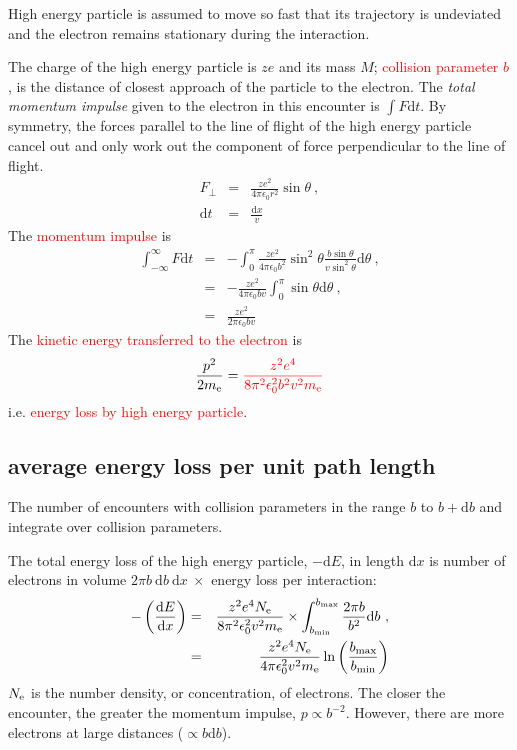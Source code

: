 \documentclass[12pt,a4paper]{article}
\newcommand{\dif}{\mathrm{d}}
\begin{document}
High energy particle is assumed to move so fast that its trajectory is undeviated and the electron remains stationary during the interaction.

The charge of the high energy particle is $ze$ and its mass $M$; \textcolor{red}{collision parameter $b$}, is the distance of closest approach of the particle to the electron. The \emph{total momentum impulse} given to the electron in this encounter is $\int F \dif t$. By symmetry, the forces parallel to the line of flight of the high energy particle cancel out and only work out the component of force perpendicular to the line of flight.
\begin{eqnarray}
\nonumber F_{\perp} &=& \frac{ze^2}{4\pi \epsilon_0 r^2} \sin \theta ~,\\
\nonumber \dif t &=& \frac{\dif x}{v}
\end{eqnarray}
The \textcolor{red}{momentum impulse} is 
\begin{eqnarray*}
\int_{-\infty}^{\infty} F \dif t &=& -\int_{0}^{\pi} \frac{ze^2}{4\pi \epsilon_0 b^2} \sin^2 \theta \frac{b\sin \theta}{v\sin^2 \theta} \dif \theta ~, \\
&=& -\frac{ze^2}{4\pi \epsilon_0 b v} \int_{0}^{\pi} \sin \theta \dif \theta ~, \\
&=& \frac{ze^2}{2\pi \epsilon_0 b v}
\end{eqnarray*}
The \textcolor{red}{kinetic energy transferred to the electron} is
\begin{equation}
\frac{p^2}{2m_{\rm e}} = \textcolor{red}{\frac{z^2 e^4}{8\pi^2 \epsilon^2_0 b^2 v^2 m_{\rm e}} }
\end{equation}
i.e. \textcolor{red}{energy loss by high energy particle}.

\subsection{average energy loss per unit path length}
The number of encounters with collision parameters in the range $b$ to $b + \dif b$ and integrate over collision parameters. 

The total energy loss of the high energy particle, $-\dif E$, in length $\dif x$ is number of electrons in volume $2\pi b ~\dif b ~\dif  x~ \times$ energy loss per interaction:
\begin{eqnarray}
\nonumber -\left(\frac{\dif E}{\dif x} \right) &=& \frac{z^2 e^4 N_{\rm e} }{8\pi^2 \epsilon^2_0 v^2 m_{\rm e}} \times \int_{b_{\rm min}}^{b_{\rm max}} \frac{2\pi b}{b^2} \dif b ~,\\
&=& \frac{z^2 e^4 N_{\rm e} }{4\pi \epsilon^2_0 v^2 m_{\rm e}} \ln \left(\frac{b_{\rm max}}{b_{\rm min}} \right)
\end{eqnarray}
$N_{\rm e}$ is the number density, or concentration, of electrons. The closer the encounter, the greater the momentum impulse, $p \propto b^{-2}$. However, there are more electrons at large distances ($\propto b \dif b$).  
\end{document}
